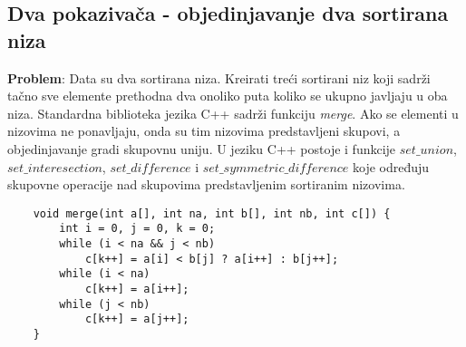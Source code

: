 \documentclass{article}
\begin{document}
\subsection{Dva pokazivača - objedinjavanje dva sortirana niza}
\textbf{Problem}: Data su dva sortirana niza. Kreirati treći sortirani niz koji sadrži
tačno sve elemente prethodna dva onoliko puta koliko se ukupno javljaju u oba
niza.
\newline
Standardna biblioteka jezika C++ sadrži funkciju \textit{merge}.
Ako se elementi u nizovima ne ponavljaju, onda su tim nizovima predstavljeni skupovi, a objedinjavanje gradi skupovnu uniju. U jeziku C++
postoje i funkcije $set\_union$, $set\_interesection$, $set\_difference$ i
$set\_symmetric\_difference$ koje određuju skupovne operacije nad skupovima
predstavljenim sortiranim nizovima.
\begin{lstlisting}
    void merge(int a[], int na, int b[], int nb, int c[]) {
        int i = 0, j = 0, k = 0;
        while (i < na && j < nb)
            c[k++] = a[i] < b[j] ? a[i++] : b[j++];
        while (i < na)
            c[k++] = a[i++];
        while (j < nb)
            c[k++] = a[j++];
    }
\end{lstlisting}
\end{document}
